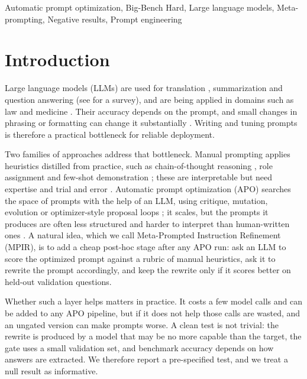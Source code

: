 \documentclass{ieeeaccess}
\begin{document}
\begin{keywords}
Automatic prompt optimization, Big-Bench Hard, Large language models, Meta-prompting, Negative results, Prompt engineering
\end{keywords}

\titlepgskip=-21pt

\maketitle

\section{Introduction}

Large language models (LLMs) are used for translation \cite{vilar2023}, summarization \cite{goyal2023} and question answering \cite{kamalloo2023} (see \cite{qin2025} for a survey), and are being applied in domains such as law and medicine \cite{colombo2024,zhang2025}. Their accuracy depends on the prompt, and small changes in phrasing or formatting can change it substantially \cite{errica2025,sclar2024}. Writing and tuning prompts is therefore a practical bottleneck for reliable deployment.

Two families of approaches address that bottleneck. Manual prompting applies heuristics distilled from practice, such as chain-of-thought reasoning \cite{wei2022}, role assignment \cite{kong2024} and few-shot demonstration \cite{brown2020}; these are interpretable but need expertise and trial and error \cite{zamfirescupereira2023,reynolds2021}. Automatic prompt optimization (APO) searches the space of prompts with the help of an LLM, using critique, mutation, evolution or optimizer-style proposal loops \cite{zhou2023,pryzant2023,guo2024,yang2024,agarwal2025}; it scales, but the prompts it produces are often less structured and harder to interpret than human-written ones \cite{ramnath2025}. A natural idea, which we call Meta-Prompted Instruction Refinement (MPIR), is to add a cheap post-hoc stage after any APO run: ask an LLM to score the optimized prompt against a rubric of manual heuristics, ask it to rewrite the prompt accordingly, and keep the rewrite only if it scores better on held-out validation questions.

Whether such a layer helps matters in practice. It costs a few model calls and can be added to any APO pipeline, but if it does not help those calls are wasted, and an ungated version can make prompts worse. A clean test is not trivial: the rewrite is produced by a model that may be no more capable than the target, the gate uses a small validation set, and benchmark accuracy depends on how answers are extracted. We therefore report a pre-specified test, and we treat a null result as informative.
\end{document}
